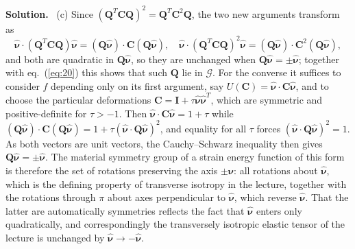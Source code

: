 \documentclass[a4paper,12pt]{paper}
\newenvironment{solution}{\par\noindent\textbf{Solution.}\ }{\par\medskip}
\begin{document}
\begin{solution}
(c) Since $(\mathbf{Q}^{T}\mathbf{C}\mathbf{Q})^{2}=\mathbf{Q}^{T}\mathbf{C}^{2}\mathbf{Q}$, the two
new arguments transform as
\begin{equation}
\hat{\bm{\nu}}\cdot(\mathbf{Q}^{T}\mathbf{C}\mathbf{Q})\hat{\bm{\nu}}=(\mathbf{Q}\hat{\bm{\nu}})\cdot\mathbf{C}(\mathbf{Q}\hat{\bm{\nu}}),\quad
\hat{\bm{\nu}}\cdot(\mathbf{Q}^{T}\mathbf{C}\mathbf{Q})^{2}\hat{\bm{\nu}}=(\mathbf{Q}\hat{\bm{\nu}})\cdot\mathbf{C}^{2}(\mathbf{Q}\hat{\bm{\nu}}),
\label{eq:22}
\end{equation}
and both are quadratic in $\mathbf{Q}\hat{\bm{\nu}}$, so they are unchanged when
$\mathbf{Q}\hat{\bm{\nu}}=\pm\hat{\bm{\nu}}$; together with eq.~(\ref{eq:20}) this
shows that such $\mathbf{Q}$ lie in $\mathcal{G}$. For the converse it suffices to consider
$f$ depending only on its first argument, say $U(\mathbf{C})=\hat{\bm{\nu}}\cdot\mathbf{C}\hat{\bm{\nu}}$,
and to choose the particular deformations $\mathbf{C}=\mathbf{I}+\tau\hat{\bm{\nu}}\hat{\bm{\nu}}^{T}$,
which are symmetric and positive-definite for $\tau>-1$. Then
$\hat{\bm{\nu}}\cdot\mathbf{C}\hat{\bm{\nu}}=1+\tau$ while
$(\mathbf{Q}\hat{\bm{\nu}})\cdot\mathbf{C}(\mathbf{Q}\hat{\bm{\nu}})=1+\tau(\hat{\bm{\nu}}\cdot\mathbf{Q}\hat{\bm{\nu}})^{2}$,
and equality for all $\tau$ forces $(\hat{\bm{\nu}}\cdot\mathbf{Q}\hat{\bm{\nu}})^{2}=1$. As
both vectors are unit vectors, the Cauchy--Schwarz inequality then gives
$\mathbf{Q}\hat{\bm{\nu}}=\pm\hat{\bm{\nu}}$. The material symmetry group of a strain energy
function of this form is therefore the set of rotations preserving the axis $\pm\hat{\bm{\nu}}$:
all rotations about $\hat{\bm{\nu}}$, which is the defining property of transverse isotropy in the
lecture, together with the rotations through $\pi$ about axes perpendicular to $\hat{\bm{\nu}}$,
which reverse $\hat{\bm{\nu}}$. That the latter are automatically symmetries reflects the fact
that $\hat{\bm{\nu}}$ enters only quadratically, and correspondingly the transversely isotropic
elastic tensor of the lecture is unchanged by $\hat{\bm{\nu}}\rightarrow-\hat{\bm{\nu}}$.


\end{solution}
\end{document}
